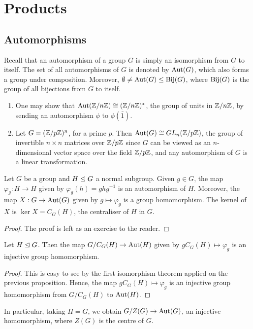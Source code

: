 \section{Products}

\subsection{Automorphisms}

Recall that an automorphism of a group $G$ is simply an isomorphism from $G$ to itself. The set of all automorphisms of $G$ is denoted by $\operatorname{Aut}(G)$, which also forms a group under composition. Moreover, $\emptyset \neq \operatorname{Aut}(G) \leq \operatorname{Bij}(G)$, where $\operatorname{Bij}(G)$ is the group of all bijections from $G$ to itself.

\begin{example}
    \begin{enumerate}
        \item One may show that $\operatorname{Aut}(\mathbb{Z}/n\mathbb{Z}) \cong (\mathbb{Z}/n\mathbb{Z})^{\ast}$, the group of units in $\mathbb{Z}/n\mathbb{Z}$, by sending an automorphism $\phi$ to $\phi(\bar{1})$.
        \item Let $G = (\mathbb{Z}/p\mathbb{Z})^{n}$, for a prime $p$. Then $\operatorname{Aut}(G) \cong GL_{n}(\mathbb{Z}/p\mathbb{Z})$, the group of invertible $n \times n$ matrices over $\mathbb{Z}/p\mathbb{Z}$ since $G$ can be viewed as an $n$-dimensional vector space over the field $\mathbb{Z}/p\mathbb{Z}$, and any automorphism of $G$ is a linear transformation.
    \end{enumerate}
\end{example}

\begin{proposition}
    Let $G$ be a group and $H \trianglelefteq G$ a normal subgroup. Given $g \in G$, the map $\varphi_{g}:H \to H$ given by $\varphi_{g}(h) = ghg^{-1}$ is an automorphism of $H$. Moreover, the map $X:G \to \operatorname{Aut}(G)$ given by $g \mapsto \varphi_{g}$ is a group homomorphism. The kernel of $X$ is $\ker X = C_{G}(H)$, the centraliser of $H$ in $G$.
\end{proposition}
\begin{proof}
    The proof is left as an exercise to the reader.
\end{proof}

\begin{corollary}
    Let $H \trianglelefteq G$. Then the map $G/C_{G}(H) \to \operatorname{Aut}(H)$ given by $gC_{G}(H) \mapsto \varphi_{g}$ is an injective group homomorphism.
\end{corollary}
\begin{proof}
    This is easy to see by the first isomorphism theorem applied on the previous proposition. Hence, the map $gC_{G}(H) \mapsto \varphi_{g}$ is an injective group homomorphism from $G/C_{G}(H)$ to $\operatorname{Aut}(H)$.
\end{proof}
In particular, taking $H = G$, we obtain $G/Z(G) \to \operatorname{Aut}(G)$, an injective homomorphism, where $Z(G)$ is the centre of $G$.

